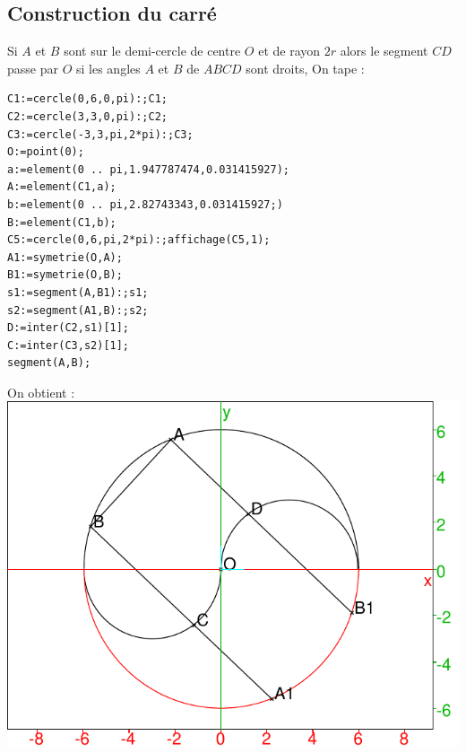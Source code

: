 \documentclass[a4paper,11pt]{book}
\begin{document}
\subsection{Construction du carr\'e}
Si $A$ et $B$ sont sur le demi-cercle de centre $O$ et de rayon $2r$ alors le 
segment $CD$ passe par $O$ si les angles $A$ et $B$ de $ABCD$ sont droits,
On tape :
\begin{verbatim}
C1:=cercle(0,6,0,pi):;C1;
C2:=cercle(3,3,0,pi):;C2;
C3:=cercle(-3,3,pi,2*pi):;C3;
O:=point(0);
a:=element(0 .. pi,1.947787474,0.031415927);
A:=element(C1,a);
b:=element(0 .. pi,2.82743343,0.031415927;)
B:=element(C1,b);
C5:=cercle(0,6,pi,2*pi):;affichage(C5,1);
A1:=symetrie(O,A);
B1:=symetrie(O,B);
s1:=segment(A,B1):;s1;
s2:=segment(A1,B):;s2;
D:=inter(C2,s1)[1];
C:=inter(C3,s2)[1];
segment(A,B);
\end{verbatim}
On obtient :\\
\includegraphics[width=\textwidth]{goutted}
\end{document}
